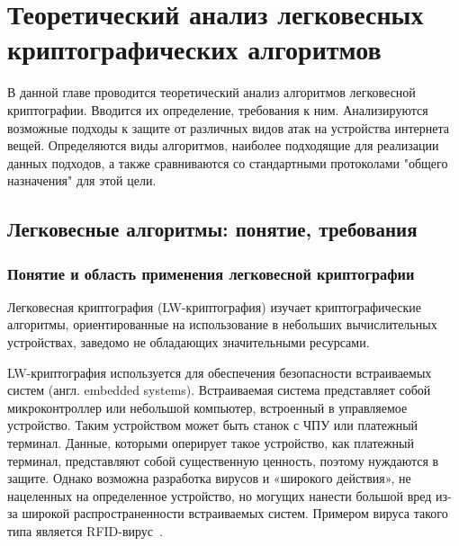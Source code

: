 \chapter{Теоретический анализ легковесных криптографических алгоритмов} \label{ch2}
	

В данной главе проводится теоретический анализ алгоритмов легковесной криптографии. Вводится их определение, требования к ним. Анализируются возможные подходы к защите от различных видов атак на устройства интернета вещей. Определяются виды алгоритмов, наиболее подходящие для реализации данных подходов, а также сравниваются со стандартными протоколами "общего назначения" для этой цели.

\section{Легковесные алгоритмы: понятие, требования} \label{ch2:sec1}

\subsection{Понятие и область применения легковесной криптографии} %

Легковесная криптография (LW-криптография) изучает криптографические алгоритмы, ориентированные на использование в небольших вычислительных устройствах, заведомо не обладающих значительными ресурсами.

LW-криптография используется для обеспечения безопасности встраиваемых систем (англ. embedded systems). Встраиваемая система представляет собой микроконтроллер или небольшой компьютер, встроенный в управляемое устройство. Таким устройством может быть станок с ЧПУ или платежный терминал. Данные, которыми оперирует такое устройство, как платежный терминал, представляют собой существенную ценность, поэтому нуждаются в защите. Однако возможна разработка вирусов и «широкого действия», не нацеленных на определенное устройство, но могущих нанести большой вред из-за широкой распространенности встраиваемых систем. Примером вируса такого типа является RFID-вирус~\cite{src22}.

